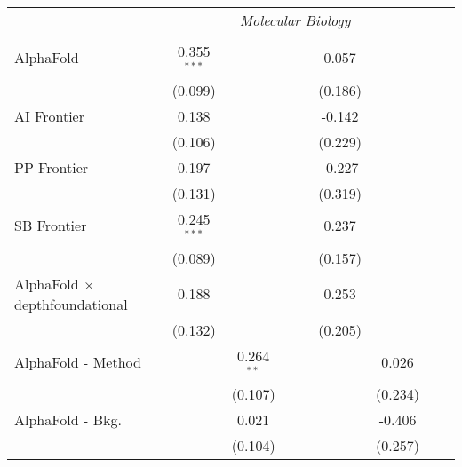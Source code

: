 \begin{tabular}{lcccccccc}
 & \multicolumn{6}{c}{\textit{Molecular Biology}} \\ \\
   AlphaFold                                      & 0.355$^{***}$ &               &        &        & 0.057   &             &       &   \\   
                                                  & (0.099)       &               &        &        & (0.186) &             &       &   \\   
   AI Frontier                                    & 0.138         &               &        &        & -0.142  &             &       &   \\   
                                                  & (0.106)       &               &        &        & (0.229) &             &       &   \\   
   PP Frontier                                    & 0.197         &               &        &        & -0.227  &             &       &   \\   
                                                  & (0.131)       &               &        &        & (0.319) &             &       &   \\   
   SB Frontier                                    & 0.245$^{***}$ &               &        &        & 0.237   &             &       &   \\   
                                                  & (0.089)       &               &        &        & (0.157) &             &       &   \\   
   AlphaFold $\times$ depthfoundational           & 0.188         &               &        &        & 0.253   &             &       &   \\   
                                                  & (0.132)       &               &        &        & (0.205) &             &       &   \\   
   AlphaFold - Method                             &               & 0.264$^{**}$  &        &        &         & 0.026       &       &   \\   
                                                  &               & (0.107)       &        &        &         & (0.234)     &       &   \\   
   AlphaFold - Bkg.                               &               & 0.021         &        &        &         & -0.406      &       &   \\   
                                                  &               & (0.104)       &        &        &         & (0.257)     &       &   \\   

\end{tabular}
